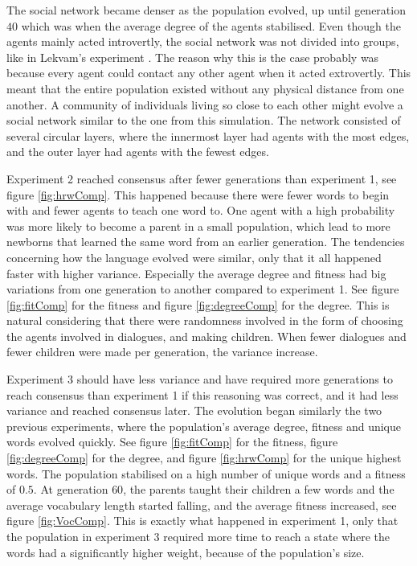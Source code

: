 The social network became denser as the population evolved, up until generation $40$ which was when the average degree of the agents stabilised. Even though the agents mainly acted introvertly, the social network was not divided into groups, like in Lekvam’s experiment \citep[Section 5.1]{lekvam2014co}. The reason why this is the case probably was because every agent could contact any other agent when it acted extrovertly. This meant that the entire population existed without any physical distance from one another. A community of individuals living so close to each other might evolve a social network similar to the one from this simulation. The network consisted of several circular layers, where the innermost layer had agents with the most edges, and the outer layer had agents with the fewest edges.

Experiment 2 reached consensus after fewer generations than experiment 1, see figure \ref{fig:hrwComp}. This happened because there were fewer words to begin with and fewer agents to teach one word to. One agent with a high probability was more likely to become a parent in a small population, which lead to more newborns that learned the same word from an earlier generation. The tendencies concerning how the language evolved were similar, only that it all happened faster with higher variance. Especially the average degree and fitness had big variations from one generation to another compared to experiment 1. See figure \ref{fig:fitComp} for the fitness and figure \ref{fig:degreeComp} for the degree. This is natural considering that there were randomness involved in the form of choosing the agents involved in dialogues, and making children. When fewer dialogues and fewer children were made per generation, the variance increase.

Experiment 3 should have less variance and have required more generations to reach consensus than experiment 1 if this reasoning was correct, and it had less variance and reached consensus later. The evolution began similarly the two previous experiments, where the population's average degree, fitness and unique words evolved quickly. See figure \ref{fig:fitComp} for the fitness, figure \ref{fig:degreeComp} for the degree, and figure \ref{fig:hrwComp} for the unique highest words. The population stabilised on a high number of unique words and a fitness of $0.5$. At generation $60$, the parents taught their children a few words and the average vocabulary length started falling, and the average fitness increased, see figure \ref{fig:VocComp}. This is exactly what happened in experiment 1, only that the population in experiment 3 required more time to reach a state where the words had a significantly higher weight, because of the population’s size. 


